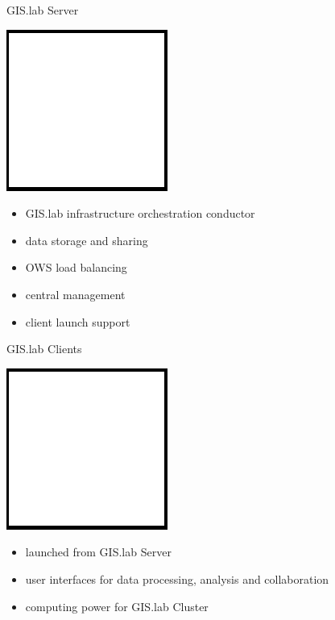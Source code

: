 \documentclass[12pt]{beamer}
\begin{document}
\begin{frame}{GIS.lab Server}
	\begin{center}
		\includegraphics[keepaspectratio=true,height=0.5\textheight]{images/image.png}
	\end{center}
	\begin{itemize}
		\item GIS.lab infrastructure orchestration conductor
		\item data storage and sharing
		\item OWS load balancing
		\item central management
		\item client launch support
	\end{itemize}
\end{frame}

\begin{frame}{GIS.lab Clients}
	\begin{center}
		\includegraphics[keepaspectratio=true,height=0.5\textheight]{images/image.png}
	\end{center}
	\begin{itemize}
		\item launched from GIS.lab Server 
		\item user interfaces for data processing, analysis and collaboration
		\item computing power for GIS.lab Cluster
	\end{itemize}
\end{frame}
\end{document}
